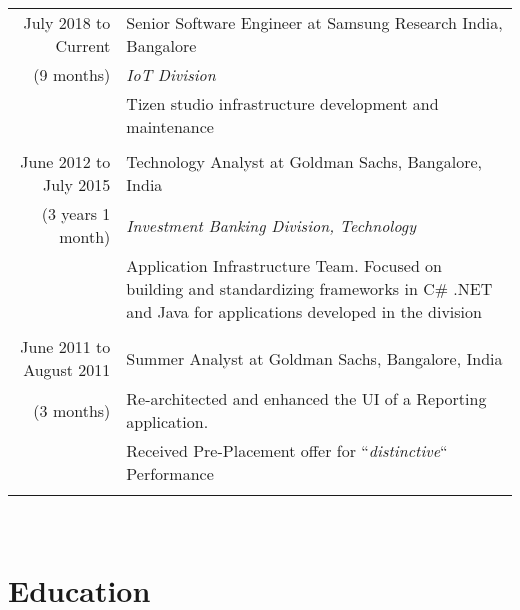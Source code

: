 \documentclass[a4paper,10pt]{article} %
\begin{document}
\begin{tabular}{r|p{12cm}}
July 2018 to Current & Senior Software Engineer at Samsung Research India, Bangalore \\
{(9 months)}& \emph{IoT Division}\\
& \small {Tizen studio infrastructure development and maintenance}\\
& \\

June 2012 to July 2015 & Technology Analyst at Goldman Sachs, Bangalore, India \\
{(3 years 1 month)}& \emph{Investment Banking Division, Technology}\\ 
& \small {Application Infrastructure Team. Focused on building and standardizing frameworks in C\# .NET and Java for
applications developed in the division}\\
& \\

June 2011 to August 2011 & Summer Analyst at Goldman Sachs, Bangalore, India \\
{(3 months)}& \small{Re-architected and enhanced the UI of a Reporting application.}\\
& \small{ Received Pre-Placement offer for ``\emph{distinctive}`` Performance }\\
& \\

\end{tabular}
\\

\section{Education}
\end{document}
